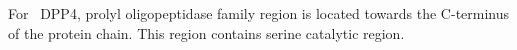 For~ DPP4, prolyl oligopeptidase family region is located towards the C-terminus of the protein chain. This region contains serine catalytic region.  